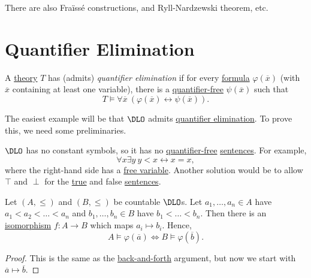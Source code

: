 \begin{remark}
	There are also Fraïssé constructions, and Ryll-Nardzewski theorem, etc.
\end{remark}

\section{Quantifier Elimination}

\begin{definition}\label{def:quantifier-elimination}
	A \hyperref[def:theory]{theory} \(T\) has (admits) \emph{quantifier elimination} if for every \hyperref[def:formula]{formula} \(\varphi (\overline{x} )\) (with \(\overline{x} \) containing at least one variable), there is a \hyperref[not:quantifier-free]{quantifier-free} \(\psi (\overline{x} )\) such that
	\[
		T \models \forall \overline{x} \ (\varphi (\overline{x} ) \leftrightarrow \psi (\overline{x} )).
	\]
\end{definition}

The easiest example will be that \(\DLO\) admits \hyperref[def:quantifier-elimination]{quantifier elimination}. To prove this, we need some preliminaries.

\begin{note}
	\(\DLO\) has no constant symbols, so it has no \hyperref[not:quantifier-free]{quantifier-free} \hyperref[def:sentence]{sentences}. For example,
	\[
		\forall x\exists y\ y < x \leftrightarrow x = x,
	\]
	where the right-hand side has a \hyperref[def:free-variable]{free variable}. Another solution would be to allow \(\top\) and \(\perp \) for the \hyperref[def:truth]{true} and false \hyperref[def:sentence]{sentences}.
\end{note}

\begin{lemma}\label{lma:DLO-isomorphism}
	Let \((A, \leq )\) and \((B, \leq )\) be countable \(\DLO\)s. Let \(a_1, \ldots , a_n\in A\) have \(a_1 < a_2 < \ldots < a_n\) and \(b_1, \ldots , b_n \in B\) have \(b_1 < \ldots < b_n\). Then there is an \hyperref[def:isomorphism]{isomorphism} \(f\colon A \to B\) which maps \(a_i \mapsto b_i\). Hence,
	\[
		A \models \varphi (\overline{a} ) \iff B \models \varphi (\overline{b} ).
	\]
\end{lemma}
\begin{proof}
	This is the same as the \hyperref[not:back-and-forth]{back-and-forth} argument, but now we start with \(\overline{a} \mapsto \overline{b} \).
\end{proof}

